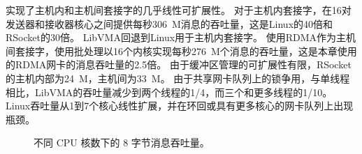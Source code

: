 \sys 实现了主机内和主机间套接字的几乎线性可扩展性。
对于主机内套接字，\sys 在16对发送器和接收器核心之间提供每秒306~M消息的吞吐量，这是Linux的40倍和RSocket的30倍。
LibVMA回退到Linux用于主机内套接字。
使用RDMA作为主机间套接字，\sys 使用批处理以16个内核实现每秒276~M个消息的吞吐量，这是本章使用的RDMA网卡的消息吞吐量的2.5倍。
由于缓冲区管理的可扩展性有限，RSocket的主机内部为24~M，主机间为33~M。
由于共享网卡队列上的锁争用，与单线程相比，LibVMA的吞吐量减少到两个线程的1/4，而三个和更多线程的1/10。
Linux吞吐量从1到7个核心线性扩展，并在环回或具有更多核心的网卡队列上出现瓶颈。


\begin{figure}[htbp]
	
	\caption{不同 CPU 核数下的 8 字节消息吞吐量。}
	\label{socksdirect:fig:eval-corenum-tput}
\end{figure}



